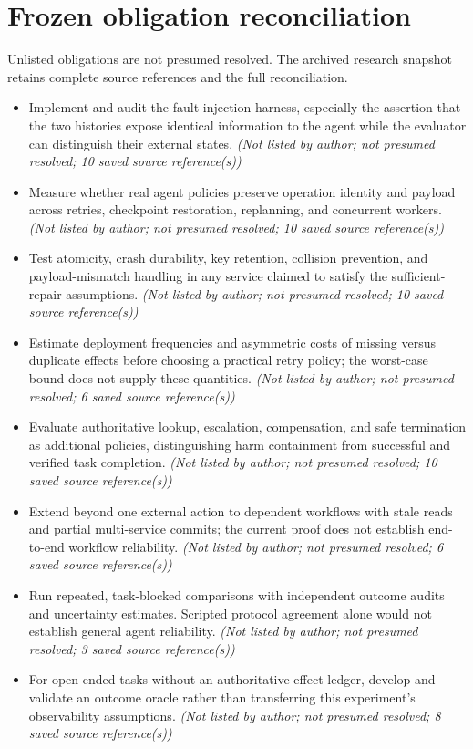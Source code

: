 \documentclass[11pt]{article}
\begin{document}
\section{Frozen obligation reconciliation}
Unlisted obligations are not presumed resolved. The archived research snapshot retains complete source references and the full reconciliation.
\begin{itemize}
\item Implement and audit the fault-injection harness, especially the assertion that the two histories expose identical information to the agent while the evaluator can distinguish their external states. \textit{ (Not listed by author; not presumed resolved; 10 saved source reference(s))}
\item Measure whether real agent policies preserve operation identity and payload across retries, checkpoint restoration, replanning, and concurrent workers. \textit{ (Not listed by author; not presumed resolved; 10 saved source reference(s))}
\item Test atomicity, crash durability, key retention, collision prevention, and payload-mismatch handling in any service claimed to satisfy the sufficient-repair assumptions. \textit{ (Not listed by author; not presumed resolved; 10 saved source reference(s))}
\item Estimate deployment frequencies and asymmetric costs of missing versus duplicate effects before choosing a practical retry policy; the worst-case bound does not supply these quantities. \textit{ (Not listed by author; not presumed resolved; 6 saved source reference(s))}
\item Evaluate authoritative lookup, escalation, compensation, and safe termination as additional policies, distinguishing harm containment from successful and verified task completion. \textit{ (Not listed by author; not presumed resolved; 10 saved source reference(s))}
\item Extend beyond one external action to dependent workflows with stale reads and partial multi-service commits; the current proof does not establish end-to-end workflow reliability. \textit{ (Not listed by author; not presumed resolved; 6 saved source reference(s))}
\item Run repeated, task-blocked comparisons with independent outcome audits and uncertainty estimates. Scripted protocol agreement alone would not establish general agent reliability. \textit{ (Not listed by author; not presumed resolved; 3 saved source reference(s))}
\item For open-ended tasks without an authoritative effect ledger, develop and validate an outcome oracle rather than transferring this experiment's observability assumptions. \textit{ (Not listed by author; not presumed resolved; 8 saved source reference(s))}

\end{itemize}
\end{document}
